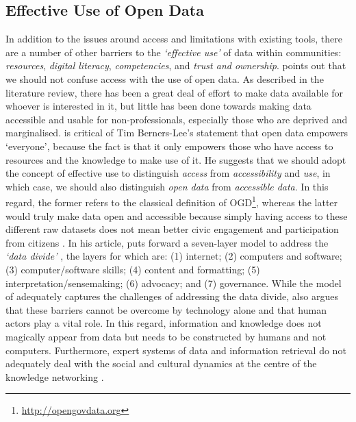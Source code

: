 \subsection{Effective Use of Open Data}
In addition to the issues around access and limitations with existing tools, there are a number of other barriers to the \textit{`effective use'} \citep{gurstein_open_2011,gurstein_effective_2003} of data within communities: \textit{resources}, \textit{digital literacy}, \textit{competencies}, and \textit{trust and ownership}. \citet{gurstein_open_2011} points out that we should not confuse access with the use of open data. As described in the literature review, there has been a great deal of effort to make data available for whoever is interested in it, but little has been done towards making data accessible and usable for non-professionals, especially those who are deprived and marginalised. \citet{gurstein_open_2011} is critical of Tim Berners-Lee's statement that open data empowers `everyone', because the fact is that it only empowers those who have access to resources and the knowledge to make use of it. He suggests that we should adopt the concept of effective use to distinguish \textit{access} from \textit{accessibility} and \textit{use}, in which case, we should also distinguish \textit{open data} from \textit{accessible data}. In this regard, the former refers to the classical definition of OGD\footnote{\url{http://opengovdata.org}}, whereas the latter would truly make data open and accessible because simply having access to these different raw datasets does not mean better civic engagement and participation from citizens \citep{davies_theres_2013}. In his article, \citet{gurstein_open_2011} puts forward a seven-layer model to address the \textit{`data divide'} \citep[p. 3]{gurstein_open_2011}, the layers for which are: (1) internet; (2) computers and software; (3) computer/software skills; (4) content and formatting; (5) interpretation/sensemaking; (6) advocacy; and (7) governance. While the model of \citet{gurstein_open_2011} adequately captures the challenges of addressing the data divide, \citet{hakken_social_2003} also argues that these barriers cannot be overcome by technology alone and that human actors play a vital role. In this regard, information and knowledge does not magically appear from data but needs to be constructed by humans and not computers. Furthermore, expert systems of data and information retrieval do not adequately deal with the social and cultural dynamics at the centre of the knowledge networking \citep{hakken_social_2003}.

